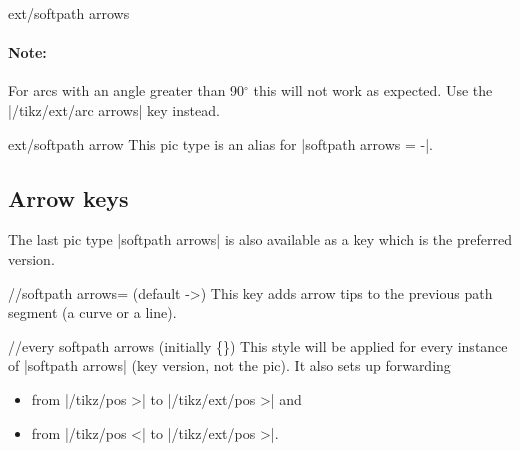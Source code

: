 \begin{multicols}{2}
\begin{pictype}{ext/softpath arrows}{}
  \paragraph{Note:} For arcs with an angle greater than 90${}^\circ$
    this will not work as expected. Use the |/tikz/ext/arc arrows| key instead.
\begin{codeexample}[preamble=\usetikzlibrary{arrows.meta, bending, ext.arrows-plus}]
\end{codeexample}
\end{pictype}
\begin{pictype}{ext/softpath arrow}{}
  This pic type is an alias for |softpath arrows = -|.
\end{pictype}

\subsection{Arrow keys}
The last pic type |softpath arrows| is also available as a key
which is the preferred version.
\begin{key}{/\tikzext/softpath arrows= (default ->)}
This key adds arrow tips to the previous path segment (a curve or a line).

\begin{stylekey}{/\tikzext/every softpath arrows (initially \{\})}
This style will be applied for every instance of |softpath arrows| (key version, not the pic).
It also sets up forwarding
\begin{itemize}
  \item from |/tikz/pos >| to |/tikz/ext/pos >| and
  \item from |/tikz/pos <| to |/tikz/ext/pos >|.
\end{itemize}
\end{stylekey}
\end{key}


\end{multicols}
